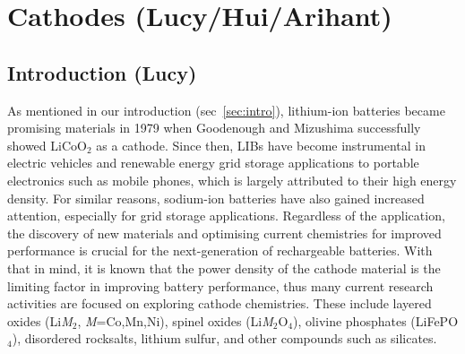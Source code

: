 \documentclass[../main.tex]{subfiles}
\begin{document}
\section{Cathodes (Lucy/Hui/Arihant)}

\subsection{Introduction (Lucy)}
As mentioned in our introduction (sec~\ref{sec:intro}), lithium-ion batteries became promising materials in 1979 when Goodenough and Mizushima successfully showed LiCoO$_2$ as a cathode.\cite{mizushima1980lixcoo2} Since then, LIBs have become instrumental in electric vehicles and renewable energy grid storage applications \cite{rozier2015li,whittingham2008materials,dunn2011electrical, liu2013materials,palacin2009recent} to portable electronics such as mobile phones, which is largely attributed to their high energy density. \cite{masquelier2013polyanionic,armand2008building,bruce2012li,park2010review,scrosati2011lithium,goodenough_li-ion_2013,etacheri2011challenges,takada2013progress,fergus2010recent,ellis2010positive,he2012layered,zaghib2013review} For similar reasons, sodium-ion batteries have also gained increased attention, especially for grid storage applications. \cite{ellis2012curr,kim2012electrode,palomares2012ion,fergus2012ion,yabuuchi2012p2} Regardless of the application, the discovery of new materials and optimising current chemistries for improved performance is crucial for the next-generation of rechargeable batteries. With that in mind, it is known that the power density of the cathode material is the limiting factor in improving battery performance, thus many current research activities are focused on exploring cathode chemistries. These include layered oxides (Li\textit{M}$_2$, \textit{M}=Co,Mn,Ni), spinel oxides (Li\textit{M}$_2$O$_4$), olivine phosphates (LiFePO$_4$), disordered rocksalts, lithium sulfur, and other compounds such as silicates. \cite{daniel2014cathode, islam2014lithium}
\end{document}
